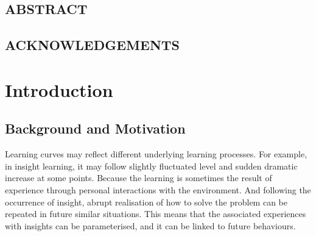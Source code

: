 \documentclass[12pt,a4paper]{report}
\begin{document}

\newpage \section*{ABSTRACT}


\newpage \section*{ACKNOWLEDGEMENTS}



\tableofcontents

\thispagestyle{empty}


\chapter{Introduction}

\setcounter{page}{1}

\section{Background and Motivation}

Learning curves may reflect different underlying learning processes. For example, in insight learning, it may follow slightly fluctuated level and sudden dramatic increase at some points. Because the learning is sometimes the result of experience through personal interactions with the environment. And following the occurrence of insight, abrupt realisation of how to solve the problem can be repeated in future similar situations. This means that the associated experiences with insights can be parameterised, and it can be linked to future behaviours.
\end{document}
